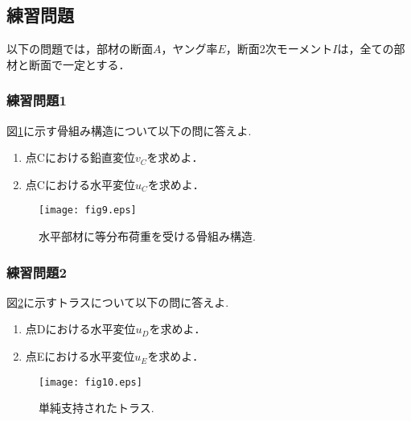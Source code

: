 \documentclass[10pt,a4j]{jarticle}
\begin{document}
\subsection{練習問題}
以下の問題では，部材の断面$A$，ヤング率$E$，断面2次モーメント$I$は，全ての部材と断面で一定とする．
\subsubsection{練習問題1}
図\ref{fig:fig9}に示す骨組み構造について以下の問に答えよ. 
\begin{enumerate}
\item
	点Cにおける鉛直変位$v_C$を求めよ．
\item
	点Cにおける水平変位$u_C$を求めよ．
\end{enumerate}
\begin{figure}[h]
	\begin{center}
	\texttt{[image: fig9.eps]} 
	\end{center}
	\caption{水平部材に等分布荷重を受ける骨組み構造.} 
	\label{fig:fig9}
\end{figure}
\subsubsection{練習問題2}
図\ref{fig:fig10}に示すトラスについて以下の問に答えよ. 
\begin{enumerate}
\item
	点Dにおける水平変位$u_D$を求めよ．
\item
	点Eにおける水平変位$u_E$を求めよ．
\end{enumerate}
\begin{figure}[h]
	\begin{center}
	\texttt{[image: fig10.eps]} 
	\end{center}
	\caption{単純支持されたトラス.} 
	\label{fig:fig10}
\end{figure}
\end{document}
